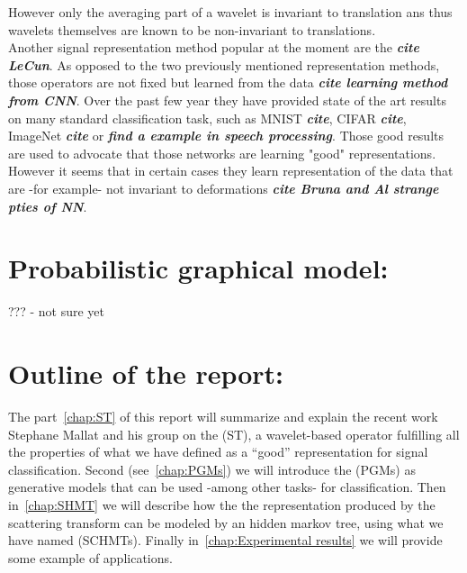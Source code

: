 \documentclass[a4paper,11pt]{report}
\begin{document}
			However only the averaging part of a wavelet is invariant to translation ans thus wavelets themselves are known to be non-invariant to translations.\\
			
			Another signal representation method popular at the moment are the  \textbf{\textit{cite LeCun}}. As opposed to the two previously mentioned representation methods, those operators are not fixed but learned from the data \textbf{\textit{cite learning method from CNN}}. Over the past few year they have provided state of the art results on many standard classification task, such as MNIST \textbf{\textit{cite}}, CIFAR \textbf{\textit{cite}}, ImageNet \textbf{\textit{cite }} or \textbf{\textit{find a example in speech processing}}. Those good results are used to advocate that those networks are learning "good" representations. However it seems that in certain cases they learn representation of the data that are -for example- not invariant to deformations \textbf{\textit{cite Bruna and Al strange pties of NN}}.\\
			         
	\section{Probabilistic graphical model:}
		??? - not sure yet
    
	\section{Outline of the report:}
    \label{seq:Intro/Outline of the report}    
		The part~\ref{chap:ST} of this report will summarize and explain the recent work Stephane Mallat and his group on the  (ST), a wavelet-based operator fulfilling all the properties of what we have defined as a ``good'' representation for signal classification. Second (see~\ref{chap:PGMs}) we will introduce the  (PGMs) as generative models that can be used -among other tasks- for classification. Then in~\ref{chap:SHMT} we will describe how the the representation produced by the scattering transform can be modeled by an hidden markov tree, using what we have named  (SCHMTs). Finally in~\ref{chap:Experimental results} we will provide some example of applications.
    
    
\end{document}

